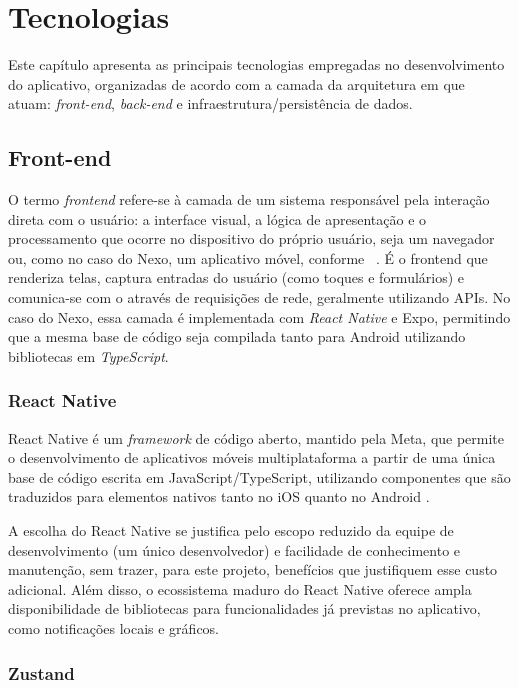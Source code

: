 \chapter{Tecnologias}

Este capítulo apresenta as principais tecnologias empregadas no desenvolvimento
do aplicativo, organizadas de acordo com a camada da arquitetura em que atuam:
\textit{front-end}, \textit{back-end} e infraestrutura/persistência de dados.

\section{Front-end}

O termo \textit{frontend} refere-se à camada de um sistema responsável pela
interação direta com o usuário: a interface visual, a lógica de apresentação e
o processamento que ocorre no dispositivo do próprio usuário, seja um navegador
ou, como no caso do Nexo, um aplicativo móvel, conforme
~\citet{sommerville:2010}. É o frontend que renderiza telas, captura entradas
do usuário (como toques e formulários) e comunica-se com o 
através de requisições de rede, geralmente utilizando APIs. No caso do Nexo,
essa camada é implementada com \textit{React Native} e Expo, permitindo que a
mesma base de código seja compilada tanto para Android utilizando bibliotecas
em \textit{TypeScript}.

\subsection{React Native}

React Native é um \textit{framework} de código aberto, mantido pela Meta, que
permite o desenvolvimento de aplicativos móveis multiplataforma a partir de
uma única base de código escrita em JavaScript/TypeScript, utilizando
componentes que são traduzidos para elementos nativos tanto no iOS quanto no
Android \citep{reactnative:2026}.

A escolha do React Native se justifica pelo escopo reduzido da equipe de
desenvolvimento (um único desenvolvedor) e facilidade de conhecimento e
manutenção, sem trazer, para este projeto, benefícios que justifiquem esse
custo adicional. Além disso, o ecossistema maduro do React Native oferece
ampla disponibilidade de bibliotecas para funcionalidades já previstas no
aplicativo, como notificações locais e gráficos.

\subsection{Zustand}

